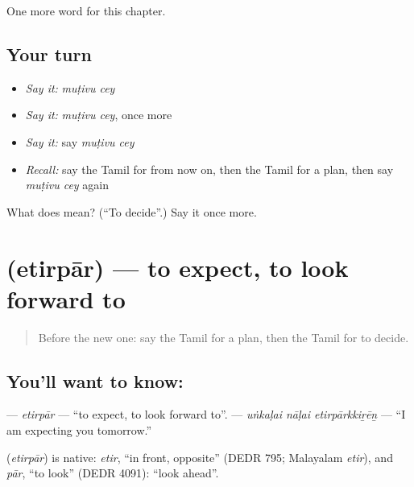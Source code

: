 \begin{grammarlens}[title={What you've built}]
One more word for this chapter.
\end{grammarlens}

\subsection*{Your turn}
\begin{itemize}
\raggedright
  \item \emph{Say it:} \emph{muṭivu cey}
  \item \emph{Say it:} \emph{muṭivu cey}, once more
  \item \emph{Say it:} say \emph{muṭivu cey}
  \item \emph{Recall:} say the Tamil for from now on, then the Tamil for a plan, then say \emph{muṭivu cey} again
\end{itemize}

\begin{tcolorbox}[breakable,colback=teal!4,colframe=teal!35!black,title={Before you move on}]
What does   mean? (\textquotedblleft{}To decide\textquotedblright{}.) Say it once more.
\end{tcolorbox}
\section[\texorpdfstring{\ta{எதிர்பார்} (etirpār)}{எதிர்பார் (etirpār)}]{ (etirpār) — to expect, to look forward to}

\label{lesson:TA-C159-etirpar}



\begin{quote}
Before the new one: say the Tamil for a plan, then the Tamil for to decide.
\end{quote}

\subsection*{You'll want to know: }
\textbf{} — \emph{etirpār} — \textquotedblleft{}to expect, to look forward to\textquotedblright{}. \textbf{  } — \emph{uṅkaḷai nāḷai etirpārkkiṟēṉ} — \textquotedblleft{}I am expecting you tomorrow.\textquotedblright{}

\begin{cousinweb}
\textbf{} (\emph{etirpār}) is native: \emph{etir}, \textquotedblleft{}in front, opposite\textquotedblright{} (DEDR 795; Malayalam \emph{etir}), and \emph{pār}, \textquotedblleft{}to look\textquotedblright{} (DEDR 4091): \textquotedblleft{}look ahead\textquotedblright{}.
\end{cousinweb}

